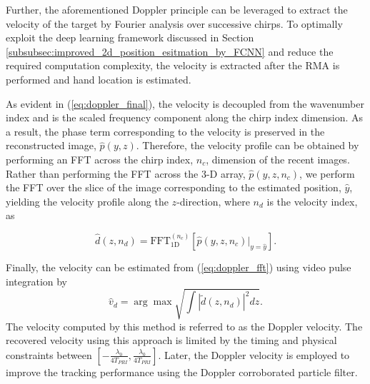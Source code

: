 \documentclass[10pt,journal,final]{IEEEtran}
\begin{document}
Further, the aforementioned Doppler principle can be leveraged to extract the velocity of the target by Fourier analysis over successive chirps. 
To optimally exploit the deep learning framework discussed in Section \ref{subsubsec:improved_2d_position_esitmation_by_FCNN} and reduce the required computation complexity, the velocity is extracted after the RMA is performed and hand location is estimated.

As evident in (\ref{eq:doppler_final}), the velocity is decoupled from the wavenumber index and is the scaled frequency component along the chirp index dimension. 
As a result, the phase term corresponding to the velocity is preserved in the reconstructed image, $\hat{p}(y,z)$. 
Therefore, the velocity profile can be obtained by performing an FFT across the chirp index, $n_c$, dimension of the recent images.
Rather than performing the FFT across the 3-D array, $\hat{p}(y,z,n_c)$, we perform the FFT over the slice of the image corresponding to the estimated position, $\hat{y}$, yielding the velocity profile along the $z$-direction, where $n_d$ is the velocity index, as

\begin{equation}
	\label{eq:doppler_fft}
	\hat{d}(z,n_d) = \text{FFT}_{\text{1D}}^{(n_c)} \left[ \hat{p}(y,z,n_c) \biggr\rvert_{y = \hat{y}} \right].
\end{equation}

Finally, the velocity can be estimated from (\ref{eq:doppler_fft}) using video pulse integration by 
\begin{equation}
	\label{eq:velocity_doppler}
	\hat{v}_d = \arg \max \sqrt{\int |\tilde{d}(z,n_d)|^2 dz}.
\end{equation}
The velocity computed by this method is referred to as the Doppler velocity.
The recovered velocity using this approach is limited by the timing and physical constraints between $[-\frac{\lambda_0}{4T_{PRI}},\frac{\lambda_0}{4T_{PRI}}]$.
Later, the Doppler velocity is employed to improve the tracking performance using the Doppler corroborated particle filter.

\end{document}
